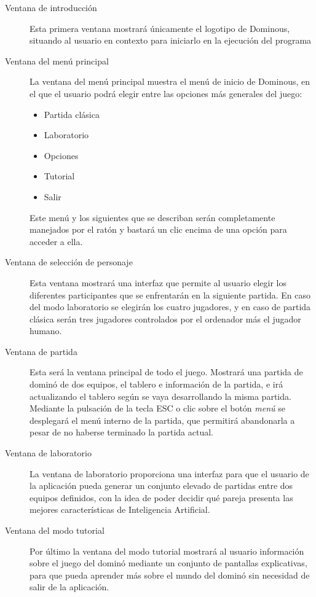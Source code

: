 \begin{description}
    \item[Ventana de introducción] Esta primera ventana mostrará únicamente el logotipo de Dominous, situando al usuario
            en contexto para iniciarlo en la ejecución del programa
    \item[Ventana del menú principal] La ventana del menú principal muestra el menú de inicio de Dominous, en el que
            el usuario podrá elegir entre las opciones más generales del juego:
            \begin{itemize}
                \item Partida clásica
                \item Laboratorio
                \item Opciones
                \item Tutorial
                \item Salir
            \end{itemize}
            Este menú y los siguientes que se describan serán completamente manejados por el ratón y bastará
            un clic encima de una opción para acceder a ella.
    \item[Ventana de selección de personaje] Esta ventana mostrará una interfaz que permite al usuario elegir los
            diferentes participantes que se enfrentarán en la siguiente partida. En caso del modo laboratorio
            se elegirán los cuatro jugadores, y en caso de partida clásica serán tres jugadores controlados por
            el ordenador más el jugador humano.
    \item[Ventana de partida] Esta será la ventana principal de todo el juego. Mostrará una partida de dominó
            de dos equipos, el tablero e información de la partida, e irá actualizando el tablero según se vaya
            desarrollando la misma partida. Mediante la pulsación de la tecla ESC o clic sobre el botón \emph{menú} se
            desplegará el menú interno de la partida, que permitirá abandonarla a pesar de no haberse terminado
            la partida actual.
    \item[Ventana de laboratorio] La ventana de laboratorio proporciona una interfaz para que el usuario de la
            aplicación pueda generar un conjunto elevado de partidas entre dos equipos definidos, con la idea
            de poder decidir qué pareja presenta las mejores características de Inteligencia Artificial.
    \item[Ventana del modo tutorial] Por último la ventana del modo tutorial mostrará al usuario información sobre
            el juego del dominó mediante un conjunto de pantallas explicativas, para que pueda aprender
            más sobre el mundo del dominó sin necesidad de salir de la aplicación.
\end{description}



